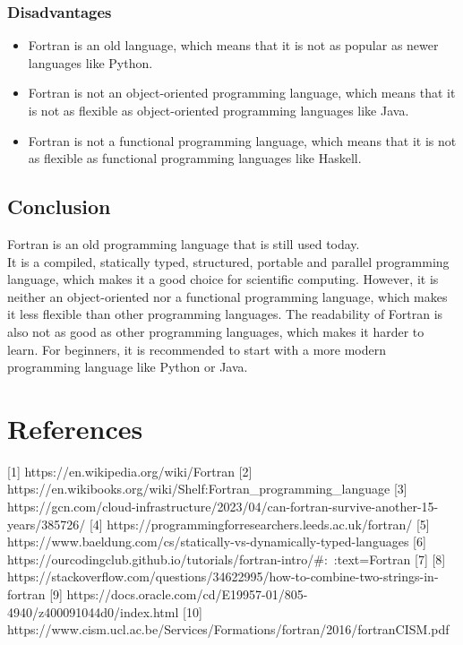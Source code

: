 \documentclass[12pt,a4paper]{scrartcl}
\begin{document}
\subsubsection{Disadvantages}
\begin{itemize}
\item Fortran is an old language, which means that it is not as popular as newer languages like Python.
\item Fortran is not an object-oriented programming language, which means that it is not as flexible as object-oriented programming languages like Java.
\item Fortran is not a functional programming language, which means that it is not as flexible as functional programming languages like Haskell.
\end{itemize}

\subsection{Conclusion}
Fortran is an old programming language that is still used today.\\
It is a compiled, statically typed, structured, portable and parallel programming language, which makes it a good choice for scientific computing. However, it is neither an object-oriented nor a functional programming language, which makes it less flexible than other programming languages.
The readability of Fortran is also not as good as other programming languages, which makes it harder to learn.
For beginners, it is recommended to start with a more modern programming language like Python or Java.\\

\section{References}
[1] https://en.wikipedia.org/wiki/Fortran
[2] https://en.wikibooks.org/wiki/Shelf:Fortran_programming_language
[3] https://gcn.com/cloud-infrastructure/2023/04/can-fortran-survive-another-15-years/385726/
[4] https://programmingforresearchers.leeds.ac.uk/fortran/
[5] https://www.baeldung.com/cs/statically-vs-dynamically-typed-languages
[6] https://ourcodingclub.github.io/tutorials/fortran-intro/#:~:text=Fortran%
[7]
[8] https://stackoverflow.com/questions/34622995/how-to-combine-two-strings-in-fortran
[9] https://docs.oracle.com/cd/E19957-01/805-4940/z400091044d0/index.html
[10] https://www.cism.ucl.ac.be/Services/Formations/fortran/2016/fortranCISM.pdf
\end{document}

